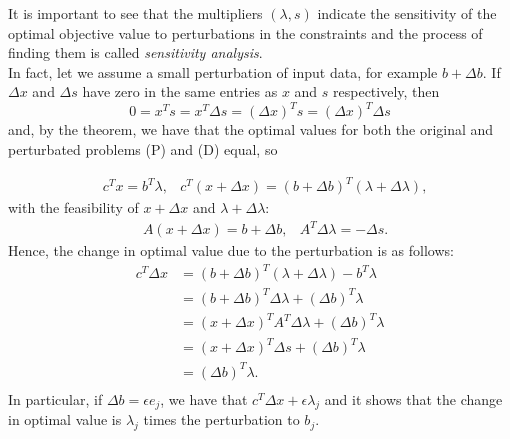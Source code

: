 \documentclass[a4paper,10 pt,titlepage,twoside]{report}
\theoremstyle{plain}
\theoremstyle{definition}
\theoremstyle{remark}
\begin{document}
It is important to see that the multipliers $(\lambda,s)$ indicate the sensitivity of the optimal objective value to perturbations in the constraints and the process of finding them is called \textit{sensitivity analysis}. \\ In fact, let we assume a small perturbation of input data, for example $b + \Delta b$. If $\Delta x$ and $\Delta s$ have zero in the same entries as $x$ and $s$ respectively, then
\begin{equation*}
0=x^{T}s=x^{T}\Delta s= \left( \Delta x\right)^{T}s=\left( \Delta x\right)^{T}\Delta s
\end{equation*}
and, by the theorem, we have that the optimal values for both the original and perturbated problems (P) and (D) equal, so

\begin{align*}
&c^{T}x=b^{T}\lambda,  &c^{T}(x + \Delta x)=\left(b+\Delta b\right)^{T}\left(\lambda+\Delta \lambda\right),
\end{align*}
with the feasibility of $x + \Delta x$ and $\lambda+\Delta \lambda$:
\begin{align*}
&A(x + \Delta x)=b+\Delta b,
&A^{T}\Delta\lambda=-\Delta s.
\end{align*}
Hence, the change in optimal value due to the perturbation is as follows:
\begin{align*}
c^{T}\Delta x&=\left(b+\Delta b\right)^{T}\left(\lambda+\Delta \lambda\right) - b^{T}\lambda\\
&=\left(b+\Delta b\right)^{T}\Delta \lambda+\left(\Delta b\right)^{T}\lambda\\
&=\left(x+\Delta x\right)^{T}A^{T}\Delta \lambda+\left(\Delta b\right)^{T}\lambda\\
&=\left(x+\Delta x\right)^{T}\Delta s+\left(\Delta b\right)^{T}\lambda\\
&=\left(\Delta b\right)^{T}\lambda.\\
\end{align*} 
In particular, if $\Delta b = \epsilon e_{j}$, we have that $c^{T}\Delta x+\epsilon \lambda_{j}$ and it shows that the change in optimal value is $\lambda_{j}$ times the perturbation to $b_{j}$.

%
%
\end{document}
